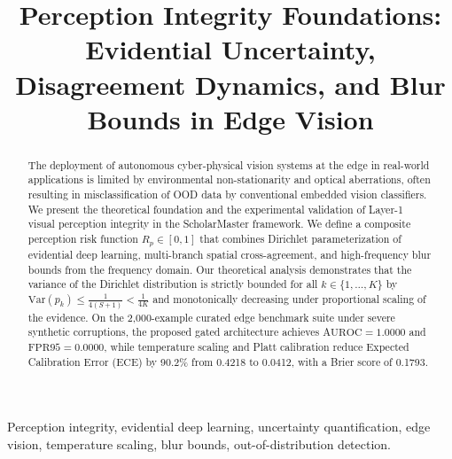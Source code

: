 \documentclass[conference]{IEEEtran}
\begin{document}
\title{Perception Integrity Foundations: Evidential Uncertainty, Disagreement Dynamics, and Blur Bounds in Edge Vision}

\author{
}

\maketitle

\begin{abstract}
The deployment of autonomous cyber-physical vision systems at the edge in real-world applications is limited by environmental non-stationarity and optical aberrations, often resulting in misclassification of OOD data by conventional embedded vision classifiers. We present the theoretical foundation and the experimental validation of Layer-1 visual perception integrity in the ScholarMaster framework. We define a composite perception risk function $R_p \in [0,1]$ that combines Dirichlet parameterization of evidential deep learning, multi-branch spatial cross-agreement, and high-frequency blur bounds from the frequency domain. Our theoretical analysis demonstrates that the variance of the Dirichlet distribution is strictly bounded for all $k \in \{1,\ldots,K\}$ by $\mathrm{Var}(p_k) \le \frac{1}{4(S + 1)} < \frac{1}{4K}$ and monotonically decreasing under proportional scaling of the evidence. On the 2,000-example curated edge benchmark suite under severe synthetic corruptions, the proposed gated architecture achieves $\text{AUROC} = 1.0000$ and $\text{FPR95} = 0.0000$, while temperature scaling and Platt calibration reduce Expected Calibration Error ($\text{ECE}$) by 90.2\% from 0.4218 to 0.0412, with a Brier score of 0.1793.
\end{abstract}

\begin{IEEEkeywords}
Perception integrity, evidential deep learning, uncertainty quantification, edge vision, temperature scaling, blur bounds, out-of-distribution detection.
\end{IEEEkeywords}
\end{document}
